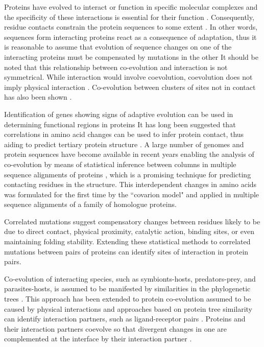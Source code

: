 Proteins have evolved to interact or function in specific molecular complexes and the specificity of these interactions is essential for their function \cite{pazos1997correlated}.
Consequently, residue contacts constrain the protein sequences to some extent \cite{pazos1997correlated}.
In other words, sequences form interacting proteins react as a consequence of adaptation, thus it is reasonable to assume that evolution of sequence changes on one of the interacting proteins must be compensated by mutations in the other \cite{pazos1997correlated}
It should be noted that this relationship between co-evolution and interaction is not symmetrical. 
While interaction would involve coevolution, coevolution does not imply physical interaction \cite{fares2006novel}.
Co-evolution between clusters of sites not in contact has also been shown \cite{fares2006novel:REF(Pritchard and Dufton 2000)}.

Identification of genes showing signs of adaptive evolution can be used in determining functional regions in proteins \cite{fares2006novel}
It has long been suggested that correlations in amino acid changes can be used to infer protein contact, thus aiding to predict tertiary protein structure \cite{morcos2011direct, burger2010disentangling}.
A large number of genomes and protein sequences have become available in recent years enabling the analysis of co-evolution by means of statistical inference between columns in multiple sequence alignments of proteins \cite{burger2010disentangling, burger2010disentangling}, which is a promising technique for predicting contacting residues in the structure.
This interdependent changes in amino acids was formulated for the first time by the ``covarion model" \cite{fitch1970improved} and applied in multiple sequence alignments of a family of homologue proteins\cite{de2013emerging}.

Correlated mutations suggest compensatory changes between residues likely to be due to direct contact, physical proximity, catalytic action, binding sites, or even maintaining folding stability.
Extending these statistical methods to correlated mutations between pairs of proteins can identify sites of interaction in protein pairs\cite{de2013emerging}.

Co‐evolution of interacting species, such as symbionts-hosts, predators-prey, and parasites-hosts, is assumed to be manifested by similarities in the phylogenetic trees \cite{de2013emerging}.
This approach has been extended to protein co‐evolution assumed to be caused by physical interactions and approaches based on protein tree similarity can identify interaction partners, such as ligand-receptor pairs \cite{de2013emerging}.
Proteins and their interaction partners coevolve so that divergent changes in one are complemented at the interface by their interaction partner  \cite{goh2000co}.

